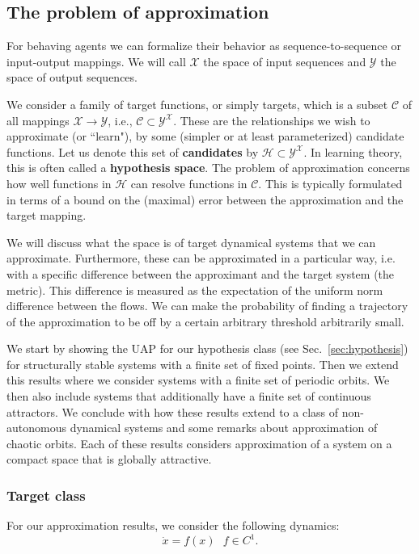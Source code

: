\documentclass{article}
\theoremstyle{definition}
\theoremstyle{remark}
\newcounter{ct}
\begin{document}
\subsection{The problem of approximation}\label{sec:approximationtheory} %
For behaving agents we can formalize their behavior as sequence-to-sequence or input-output mappings.
We will call $\mathcal{X}$ the space of input sequences and $\mathcal{Y}$ the space of output sequences.

We consider a family of target functions, or simply targets, which is a subset \(\mathcal{C} \) of all mappings \( \mathcal{X} \rightarrow \mathcal{Y} \), i.e., \( \mathcal{C} \subset \mathcal{Y}^\mathcal{X} \). 
These are the relationships we wish to approximate (or ``learn"), by some (simpler or at least parameterized) candidate functions.
Let us denote this set of \textbf{candidates} by \( \mathcal{H} \subset \mathcal{Y}^\mathcal{X} \).
In learning theory, this is often called a \textbf{hypothesis space}.
The problem of approximation concerns how well functions in \( \mathcal{H} \) can resolve functions in \( \mathcal{C} \).
This is typically formulated in terms of a bound on the (maximal) error between the approximation and the target mapping.

We will discuss what the space is of target dynamical systems that we can approximate.
Furthermore, these can be approximated in a particular way, i.e. with a specific difference between the approximant and the target system (the metric).
This difference is measured as the expectation of the uniform norm difference between the flows. 
We can make the probability of finding a trajectory of the approximation to be off by a certain arbitrary threshold arbitrarily small. 


We start by showing the UAP for our hypothesis class (see Sec.~\ref{sec:hypothesis}) for structurally stable systems with a finite set of fixed points.
Then we extend this results where we consider systems with a finite set of periodic orbits.
We then also include systems that additionally have a finite set of continuous attractors.
We conclude with how these results extend to a class of non-autonomous dynamical systems and some remarks about approximation of chaotic orbits.
Each of these results considers approximation of a system on a compact space that is globally attractive. %



\subsubsection{Target class}\label{sec:target}
For our approximation results, we consider the following dynamics:
\begin{equation}
\dot x = f(x)   \ \ \ f\in C^1.
\end{equation}
\end{document}
